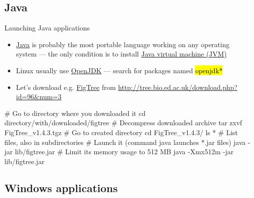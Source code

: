 \documentclass[compress, ucs, xelatex, 11pt, xcolor=svgnames,
  hyperref={
    bookmarks=true,
    unicode=true,
    colorlinks=true,
    pdftitle={Linux, command line and MetaCentrum},
    plainpages=false,
    pdfauthor={Vojtech Zeisek},
    pdfsubject={Course about use of Linux command line, writing shell scripts and using MetaCentrum of CESNET},
    pdfcreator={XeLaTeX},
    pdfkeywords={Linux, GNU, BASH, shell, command line, MetaCentrum},
    linkcolor=DarkRed,
    anchorcolor=DarkBlue,
    citecolor=Indigo,
    filecolor=NavyBlue,
    menucolor=DarkMagenta,
    urlcolor=DarkBlue,
    pdftex},
  url={hyphens, lowtilde} %
  ]{beamer}
\renewcommand{\texttt}[1]{\hl{\ttfamily #1}}
\begin{document}
\subsection{Java}

\begin{frame}[fragile]{Launching Java applications}
  \begin{itemize}
    \item \href{https://www.java.com/}{Java} is probably the most portable language working on any operating system --- the only condition is to install \href{https://en.wikipedia.org/wiki/Java_virtual_machine}{Java virtual machine (JVM)}
    \item Linux usually use \href{http://openjdk.java.net/}{OpenJDK} --- search for packages named \texttt{*openjdk*}
    \item Let's download e.g. \href{http://tree.bio.ed.ac.uk/software/figtree/}{FigTree} from \url{http://tree.bio.ed.ac.uk/download.php?id=96&num=3}
  \end{itemize}
  \begin{bashcode}
    # Go to directory where you downloaded it
    cd directory/with/downloaded/figtree
    # Decompress downloaded archive
    tar zxvf FigTree_v1.4.3.tgz
    # Go to created directory
    cd FigTree_v1.4.3/
    ls * # List files, also in subdirectories
    # Launch it (command java launches *.jar files)
    java -jar lib/figtree.jar
    # Limit its memory usage to 512 MB
    java -Xmx512m -jar lib/figtree.jar
  \end{bashcode}
\end{frame}

\subsection{Windows applications}
\end{document}
